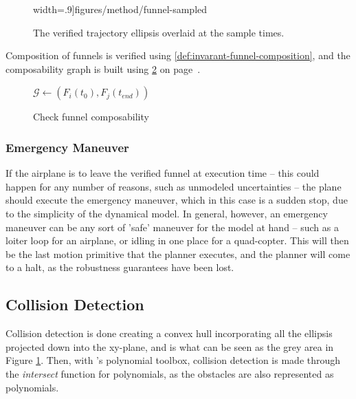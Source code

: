 \begin{figure}[!t]
\begin{minipage}[c]{.45\columnwidth}
    width=.9\columnwidth]{figures/method/funnel-sampled}
    \caption{The verified trajectory ellipsis overlaid at the sample times.}
    \label{fig:funnel-straight-sampled}
  \end{minipage}
\end{figure}

Composition of funnels is verified using \cref{def:invarant-funnel-composition},
and the composability graph is built using \cref{alg:create-funnel-graph} on
page~\pageref{alg:create-funnel-graph}.

\begin{figure}[!t]
  \caption{Check funnel composability}
  \label{alg:create-funnel-graph}
  \begin{algorithmic}[0]
     
      \State \(\mathcal{G} \leftarrow{} \left( F_{i}(t_{0}), F_{j}(t_{end})
      \right)\)
    \EndIf
    \EndFor
    \EndFor
    \EndProcedure
  \end{algorithmic}
\end{figure}


\subsubsection{Emergency Maneuver}

If the airplane is to leave the verified funnel at execution time -- this could
happen for any number of reasons, such as unmodeled uncertainties -- the plane
should execute the emergency maneuver, which in this case is a sudden stop, due
to the simplicity of the dynamical model. In general, however, an emergency
maneuver can be any sort of 'safe' maneuver for the model at hand -- such as a
loiter loop for an airplane, or idling in one place for a quad-copter. This will
then be the last motion primitive that the planner executes, and the planner
will come to a halt, as the robustness guarantees have been lost.


\subsection{Collision Detection}

Collision detection is done creating a convex hull incorporating all the
ellipsis projected down into the xy-plane, and is what can be seen as the grey
area in Figure \ref{fig:funnel-straight-sampled}. Then, with \matlab's
polynomial toolbox, collision detection is made through the \textit{intersect}
function for polynomials, as the obstacles are also represented as polynomials.


